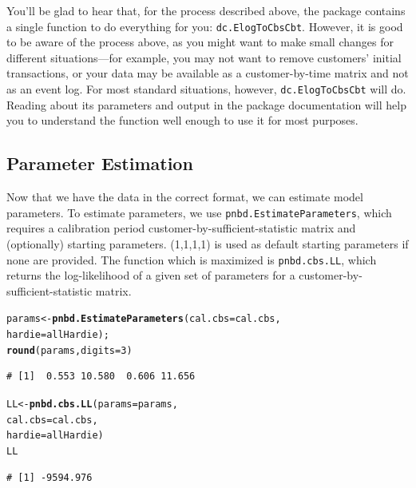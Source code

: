 \documentclass[10pt, letterpaper, onecolumn, oneside, final]{article}\usepackage[]{graphicx}\usepackage[]{color}
\makeatletter
\newcommand{\hlnum}[1]{\textcolor[rgb]{0.686,0.059,0.569}{#1}}%
\newcommand{\hlstd}[1]{\textcolor[rgb]{0.345,0.345,0.345}{#1}}%
\newcommand{\hlkwb}[1]{\textcolor[rgb]{0.69,0.353,0.396}{#1}}%
\newcommand{\hlkwc}[1]{\textcolor[rgb]{0.333,0.667,0.333}{#1}}%
\newcommand{\hlkwd}[1]{\textcolor[rgb]{0.737,0.353,0.396}{\textbf{#1}}}%
\newenvironment{kframe}{%
 \def\at@end@of@kframe{}%
 \ifinner\ifhmode%
  \def\at@end@of@kframe{\end{minipage}}%
  \begin{minipage}{\columnwidth}%
 \fi\fi%
 \def\FrameCommand##1{\hskip\@totalleftmargin \hskip-\fboxsep
 \colorbox{shadecolor}{##1}\hskip-\fboxsep
     \hskip-\linewidth \hskip-\@totalleftmargin \hskip\columnwidth}%
 \MakeFramed {\advance\hsize-\width
   \@totalleftmargin\z@ \linewidth\hsize
   \@setminipage}}%
 {\par\unskip\endMakeFramed%
 \at@end@of@kframe}
\newenvironment{knitrout}{}{} %
\makeatother
\begin{document}
You'll be glad to hear that, for the process described above, the
package contains a single function to do everything for you:
\texttt{dc.ElogToCbsCbt}. However, it is good to be aware of the
process above, as you might want to make small changes for different
situations---for example, you may not want to remove customers'
initial transactions, or your data may be available as a
customer-by-time matrix and not as an event log. For most standard
situations, however, \texttt{dc.ElogToCbsCbt} will do. Reading about
its parameters and output in the package documentation will help you
to understand the function well enough to use it for most purposes.

\subsection{Parameter Estimation}

Now that we have the data in the correct format, we can estimate model
parameters. To estimate parameters, we use
\texttt{pnbd.EstimateParameters}, which requires a calibration period
customer-by-sufficient-statistic matrix and (optionally) starting
parameters. (1,1,1,1) is used as default starting parameters if none
are provided. The function which is maximized is \texttt{pnbd.cbs.LL},
which returns the log-likelihood of a given set of parameters for a
customer-by-sufficient-statistic matrix.

\begin{knitrout}
\color{fgcolor}\begin{kframe}
\begin{alltt}
\hlstd{params} \hlkwb{<-} \hlkwd{pnbd.EstimateParameters}\hlstd{(}\hlkwc{cal.cbs} \hlstd{= cal.cbs,}
                                  \hlkwc{hardie} \hlstd{= allHardie);}
\hlkwd{round}\hlstd{(params,} \hlkwc{digits} \hlstd{=} \hlnum{3}\hlstd{)}
\end{alltt}
\begin{verbatim}
# [1]  0.553 10.580  0.606 11.656
\end{verbatim}
\begin{alltt}
\hlstd{LL} \hlkwb{<-} \hlkwd{pnbd.cbs.LL}\hlstd{(}\hlkwc{params} \hlstd{= params,}
                  \hlkwc{cal.cbs} \hlstd{= cal.cbs,}
                  \hlkwc{hardie} \hlstd{= allHardie)}
\hlstd{LL}
\end{alltt}
\begin{verbatim}
# [1] -9594.976
\end{verbatim}
\end{kframe}
\end{knitrout}
\end{document}
